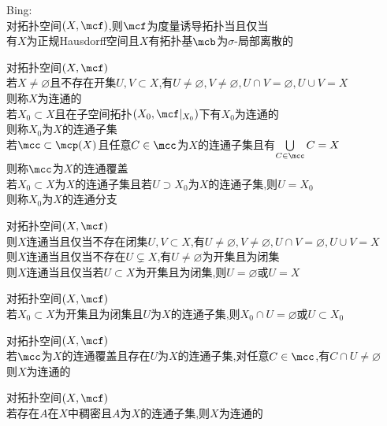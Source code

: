 \begin{dingli}
Bing:\\
对拓扑空间$(X,\mcf)$,则$\mcf$为度量诱导拓扑当且仅当\\
有$X$为正规Hausdorff空间且$X$有拓扑基$\mcb$为$\sigma$-局部离散的
\end{dingli}

\begin{dingyi}
对拓扑空间$(X,\mcf)$\\
若$X\neq\varnothing$且不存在开集$U,V\subset X$,有$U\neq\varnothing,V\neq\varnothing,U\cap V=\varnothing,U\cup V=X$\\
则称$X$为连通的\\
若$X_0\subset X$且在子空间拓扑$(X_0,\mcf|_{X_0})$下有$X_0$为连通的\\
则称$X_0$为$X$的连通子集\\
若$\mcc\subset\mcp(X)$且任意$C\in\mcc$为$X$的连通子集且有$\bigcup\limits_{C\in\mcc}C=X$\\
则称$\mcc$为$X$的连通覆盖\\
若$X_0\subset X$为$X$的连通子集且若$U\supset X_0$为$X$的连通子集,则$U=X_0$\\
则称$X_0$为$X$的连通分支
\end{dingyi}

\begin{dingli}
对拓扑空间$(X,\mcf)$\\
则$X$连通当且仅当不存在闭集$U,V\subset X$,有$U\neq\varnothing,V\neq\varnothing,U\cap V=\varnothing,U\cup V=X$\\
则$X$连通当且仅当不存在$U\subsetneq X$,有$U\neq \varnothing$为开集且为闭集\\
则$X$连通当且仅当若$U\subset X$为开集且为闭集,则$U=\varnothing$或$U=X$
\end{dingli}

\begin{dingli}
对拓扑空间$(X,\mcf)$\\
若$X_0\subset X$为开集且为闭集且$U$为$X$的连通子集,则$X_0\cap U=\varnothing$或$U\subset X_0$
\end{dingli}

\begin{dingli}
对拓扑空间$(X,\mcf)$\\
若$\mcc$为$X$的连通覆盖且存在$U$为$X$的连通子集,对任意$C\in\mcc$,有$C\cap U\neq\varnothing$\\
则$X$为连通的
\end{dingli}

\begin{dingli}
对拓扑空间$(X,\mcf)$\\
若存在$A$在$X$中稠密且$A$为$X$的连通子集,则$X$为连通的
\end{dingli}

